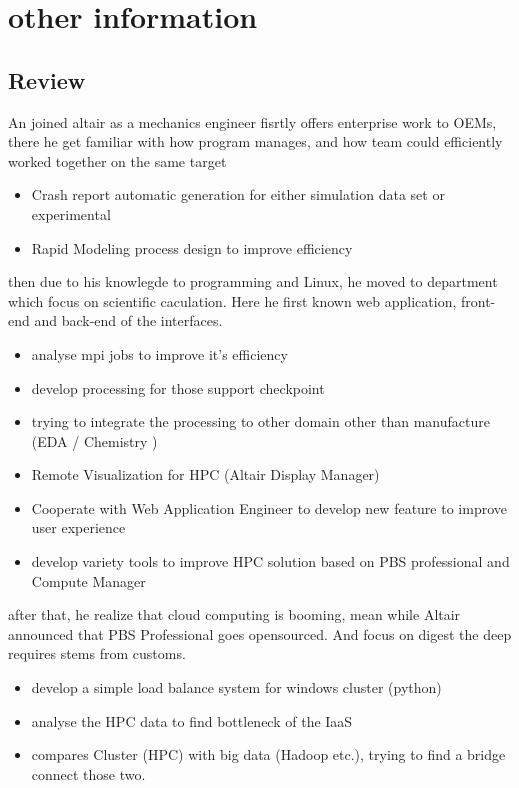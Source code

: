 \documentclass[letterpaper]{twentysecondcv} %
\begin{document}
\section{other information}

\subsection{Review}

An joined altair as a mechanics engineer fisrtly offers enterprise work to OEMs, there he get familiar with
how program manages, and how team could efficiently worked together on the same target

{\small \begin{itemize}
  \item Crash report automatic generation for either  simulation data set or experimental
  \item Rapid Modeling process design to improve efficiency
\end{itemize}}


then due to his knowlegde to programming and Linux, he moved to department which focus on scientific caculation.
Here he first known web application, front-end and back-end of the interfaces.
{\small
\begin{itemize}
  \item analyse mpi jobs to improve it's efficiency
  \item develop processing for those support checkpoint
  \item trying to integrate the processing to other domain other than manufacture (EDA / Chemistry )
  \item Remote Visualization for HPC (Altair Display Manager)
  \item Cooperate with Web Application Engineer to develop new feature to improve user experience
  \item develop variety tools to improve HPC solution based on PBS professional and Compute Manager
\end{itemize}}

after that, he realize that cloud computing is booming, mean while Altair announced that PBS Professional goes opensourced. And focus on digest the deep requires stems from customs. 
{\small \begin{itemize}
\item develop a simple load balance system for windows cluster (python)
\item analyse the HPC data  to find bottleneck of the IaaS
\item compares Cluster (HPC) with big data (Hadoop etc.), trying to find a bridge connect those two.
\end{itemize}}
\end{document}
